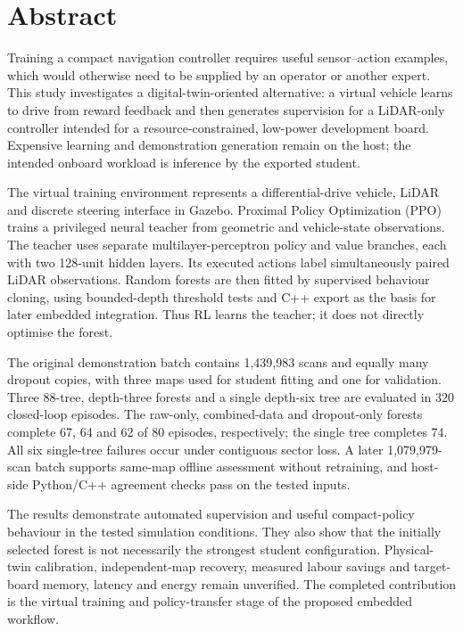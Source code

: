 \chapter*{Abstract}
Training a compact navigation controller requires useful sensor--action examples,
which would otherwise need to be supplied by an operator or another expert.
This study investigates a digital-twin-oriented alternative: a virtual vehicle
learns to drive from reward feedback and then generates supervision for a
LiDAR-only controller intended for a resource-constrained, low-power development
board. Expensive learning and demonstration generation remain on the host;
the intended onboard workload is inference by the exported student.

The virtual training environment represents a differential-drive vehicle,
LiDAR and discrete steering interface in Gazebo. Proximal Policy Optimization
(PPO) trains a privileged neural teacher from geometric and vehicle-state
observations. The teacher uses separate multilayer-perceptron policy and value
branches, each with two 128-unit hidden layers. Its executed actions label
simultaneously paired LiDAR observations. Random forests are then fitted by
supervised behaviour cloning, using bounded-depth threshold tests and C++
export as the basis for later embedded integration. Thus RL learns the teacher;
it does not directly optimise the forest.

The original demonstration batch contains 1,439,983 scans and equally many
dropout copies, with three maps used for student fitting and one for validation.
Three 88-tree, depth-three forests and a single depth-six tree are evaluated
in 320 closed-loop episodes. The raw-only, combined-data and dropout-only forests
complete 67, 64 and 62 of 80 episodes, respectively; the single tree completes
74. All six single-tree failures occur under contiguous sector loss. A later
1,079,979-scan batch supports same-map offline assessment without retraining,
and host-side Python/C++ agreement checks pass on the tested inputs.

The results demonstrate automated supervision and useful compact-policy behaviour
in the tested simulation conditions. They also show that the initially selected
forest is not necessarily the strongest student configuration. Physical-twin
calibration, independent-map recovery, measured labour savings and target-board
memory, latency and energy remain unverified. The completed contribution is
the virtual training and policy-transfer stage of the proposed embedded workflow.
